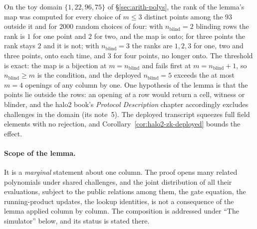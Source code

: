 \documentclass[11pt,a4paper]{article}
\theoremstyle{definition}
\begin{document}
On the toy domain $\{1, 22, 96, 75\}$ of \S\ref{sec:arith-polys}, the rank
of the lemma's map was computed for every choice of $m \le 3$ distinct
points among the $93$ outside it and for $2000$ random choices of four:
with $n_{\mathrm{blind}} = 2$ blinding rows the rank is $1$ for one
point and $2$ for two, and the map is onto; for three points the rank
stays $2$ and it is not; with $n_{\mathrm{blind}} = 3$ the ranks are
$1, 2, 3$ for one, two and three points, onto each time, and $3$ for
four points, no longer onto. The threshold is exact: the map is a
bijection at $m = n_{\mathrm{blind}}$ and fails first at
$m = n_{\mathrm{blind}} + 1$, so $n_{\mathrm{blind}} \ge m$ is the
condition, and the deployed $n_{\mathrm{blind}} = 5$ exceeds the at most
$m = 4$ openings of any column by one. One
hypothesis of the lemma is that the points lie outside the rows: an
opening \emph{at} a row would return a cell, witness or blinder, and the
halo2 book's \emph{Protocol Description} chapter accordingly excludes
challenges in the domain (its note~5). The deployed transcript squeezes
full field elements with no rejection, and
Corollary~\ref{cor:halo2-zk-deployed} bounds the effect.

\paragraph{Scope of the lemma.}
It is a \emph{marginal} statement about one column. The proof opens many
related polynomials under shared challenges, and the joint distribution
of all their evaluations, subject to the public relations among them,
the gate equation, the running-product updates, the lookup identities, is
not a consequence of the lemma applied column by column. The
composition is addressed under ``The simulator'' below, and its status is
stated there.
\end{document}
